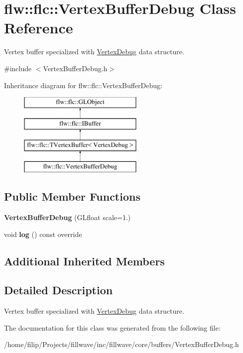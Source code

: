 \hypertarget{classflw_1_1flc_1_1VertexBufferDebug}{}\section{flw\+:\+:flc\+:\+:Vertex\+Buffer\+Debug Class Reference}
\label{classflw_1_1flc_1_1VertexBufferDebug}


Vertex buffer specialized with \hyperlink{structflw_1_1flc_1_1VertexDebug}{Vertex\+Debug} data structure.  




{\ttfamily \#include $<$Vertex\+Buffer\+Debug.\+h$>$}

Inheritance diagram for flw\+:\+:flc\+:\+:Vertex\+Buffer\+Debug\+:\begin{figure}[H]
\begin{center}
\leavevmode
\includegraphics[height=4.000000cm]{classflw_1_1flc_1_1VertexBufferDebug}
\end{center}
\end{figure}
\subsection*{Public Member Functions}
\begin{DoxyCompactItemize}
\item 
{\bfseries Vertex\+Buffer\+Debug} (G\+Lfloat scale=1.)\hypertarget{classflw_1_1flc_1_1VertexBufferDebug_a4a87d4c29bc2b8d99f84a4f005f2d8bd}{}\label{classflw_1_1flc_1_1VertexBufferDebug_a4a87d4c29bc2b8d99f84a4f005f2d8bd}

\item 
void {\bfseries log} () const override\hypertarget{classflw_1_1flc_1_1VertexBufferDebug_a75376a3b92cee18edf4e88ee34d8bc62}{}\label{classflw_1_1flc_1_1VertexBufferDebug_a75376a3b92cee18edf4e88ee34d8bc62}

\end{DoxyCompactItemize}
\subsection*{Additional Inherited Members}


\subsection{Detailed Description}
Vertex buffer specialized with \hyperlink{structflw_1_1flc_1_1VertexDebug}{Vertex\+Debug} data structure. 

The documentation for this class was generated from the following file\+:\begin{DoxyCompactItemize}
\item 
/home/filip/\+Projects/fillwave/inc/fillwave/core/buffers/Vertex\+Buffer\+Debug.\+h\end{DoxyCompactItemize}
